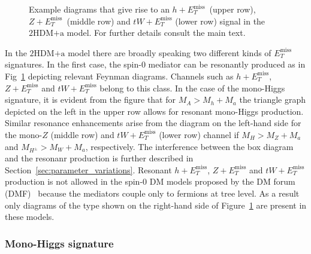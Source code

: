\documentclass[a4paper, 11pt,notoc]{article}
\newcommand{\MET}{\ensuremath{E_T^\mathrm{miss}}\xspace}
\newcommand{\hdma}{\ensuremath{\textrm{2HDM+a}}\xspace}
\begin{document}
\begin{figure}[t!]
\vspace{4mm}
\caption{\label{fig:resonant} Example diagrams that give rise to an $h+\MET$~(upper row), $Z+\MET$~(middle row) and $tW + \MET$ (lower row) signal in the \hdma model. For further details consult the main text. }
\end{figure}

In the \hdma model there are broadly speaking two different kinds of $\MET$ signatures. In the first case, the spin-0 mediator can be resonantly produced as in Fig~\ref{fig:resonant} depicting relevant Feynman diagrams. Channels such as $h+\MET$, $Z+ \MET$ and $tW+\MET$ belong to this class. In the case of the mono-Higgs signature, it is evident from the figure that for $M_A > M_h + M_a$ the triangle  graph depicted on the left in the upper row  allows for resonant mono-Higgs production.  Similar resonance enhancements arise from the diagram on the left-hand side for the mono-$Z$ (middle row) and $tW+\MET$ (lower row) channel if $M_H > M_Z + M_a$ and $M_{H^\pm} > M_W + M_a$, respectively. The interference between the box diagram and the resonanr production is further described in Section~\ref{sec:parameter_variations}. Resonant $h+\MET$, $Z+\MET$ and $tW+\MET$ production is not allowed in the spin-0 DM models proposed by the DM forum (DMF)~\cite{Abercrombie:2015wmb} because the mediators couple only to fermions at tree level. As a result only diagrams of the type shown on the right-hand side of Figure~\ref{fig:resonant} are present in these models. 

\subsubsection{Mono-Higgs signature}
\end{document}
